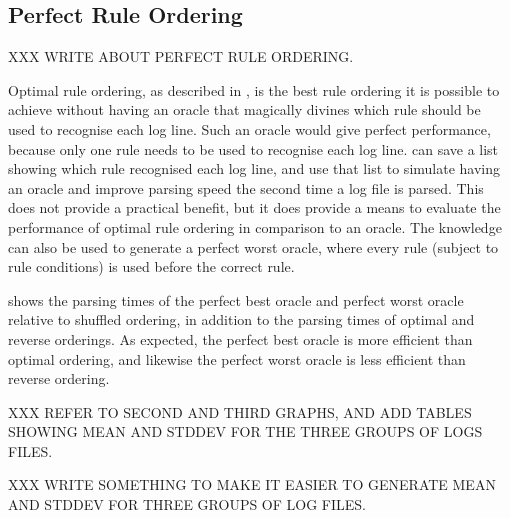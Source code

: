 \subsection{Perfect Rule Ordering}

\label{perfect rule ordering}

XXX WRITE ABOUT PERFECT RULE ORDERING\@.

Optimal rule ordering, as described in , is the best rule ordering it is possible to achieve without
having an oracle that magically divines which rule should be used to
recognise each log line.  Such an oracle would give perfect performance,
because only one rule needs to be used to recognise each log line.
\parsername{} can save a list showing which rule recognised each log line,
and use that list to simulate having an oracle and improve parsing speed
the second time a log file is parsed.   This does not provide a practical
benefit, but it does provide a means to evaluate the performance of optimal
rule ordering in comparison to an oracle.  The knowledge can also be used
to generate a perfect worst oracle, where every rule (subject to rule
conditions) is used before the correct rule.

 shows the parsing times of the perfect best oracle and
perfect worst oracle relative to shuffled ordering, in addition to the
parsing times of optimal and reverse orderings.  As expected, the perfect
best oracle is more efficient than optimal ordering, and likewise the
perfect worst oracle is less efficient than reverse ordering.

XXX REFER TO SECOND AND THIRD GRAPHS, AND ADD TABLES SHOWING MEAN AND
STDDEV FOR THE THREE GROUPS OF LOGS FILES\@.

XXX WRITE SOMETHING TO MAKE IT EASIER TO GENERATE MEAN AND STDDEV FOR THREE
GROUPS OF LOG FILES\@.




